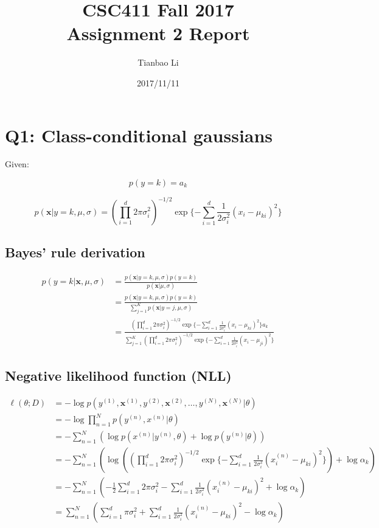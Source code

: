 \documentclass[a4paper]{article}
\title{CSC411 Fall 2017\\Assignment 2 Report}
\author{Tianbao Li}
\date{2017/11/11}
\begin{document}
\maketitle

\section{Q1: Class-conditional gaussians}

Given:

\begin{equation}
    p(y=k)=a_k
\end{equation}

\begin{equation}
    p(\mathbf{x}|y=k,\mu,\sigma)=(\prod^d_{i=1}2\pi\sigma^2_i)^{-1/2}\exp\{-\sum^d_{i=1}\frac{1}{2\sigma^2_i}(x_i-\mu_{ki})^2\}
\end{equation}

\subsection{Bayes' rule derivation}

\begin{align*}
    p(y=k|\mathbf{x},\mu,\sigma)&=\frac{p(\mathbf{x}|y=k,\mu,\sigma)p(y=k)}{p(\mathbf{x}|\mu,\sigma)}\\
    &=\frac{p(\mathbf{x}|y=k,\mu,\sigma)p(y=k)}{\sum^K_{j=1}p(\mathbf{x}|y=j,\mu,\sigma)}\\
    &=\frac{(\prod^d_{i=1}2\pi\sigma^2_i)^{-1/2}\exp\{-\sum^d_{i=1}\frac{1}{2\sigma^2_i}(x_i-\mu_{ki})^2\}a_k}{\sum^K_{j=1}(\prod^d_{i=1}2\pi\sigma^2_i)^{-1/2}\exp\{-\sum^d_{i=1}\frac{1}{2\sigma^2_i}(x_i-\mu_{ji})^2\}}
\end{align*}

\subsection{Negative likelihood function (NLL)}

\begin{align*}
    \ell(\theta;D)&=-\log p(y^{(1)},\mathbf{x}^{(1)},y^{(2)},\mathbf{x}^{(2)},\dots,y^{(N)},\mathbf{x}^{(N)}|\theta)\\
    &=-\log\prod^N_{n=1}p(y^{(n)},x^{(n)}|\theta)\\
    &=-\sum^N_{n=1}(\log p(x^{(n)}|y^{(n)},
    \theta)+\log p(y^{(n)}|\theta))\\
    &=-\sum^N_{n=1}(\log((\prod^d_{i=1}2\pi\sigma^2_i)^{-1/2}\exp\{-\sum^d_{i=1}\frac{1}{2\sigma^2_i}(x_i^{(n)}-\mu_{ki})^2\})+\log\alpha_k)\\
    &=-\sum^N_{n=1}(-\frac{1}{2}\sum^d_{i=1}2\pi\sigma^2_i-\sum^d_{i=1}\frac{1}{2\sigma^2_i}(x^{(n)}_i-\mu_{ki})^2+\log\alpha_k)\\
    &=\sum^N_{n=1}(\sum^d_{i=1}\pi\sigma^2_i+\sum^d_{i=1}\frac{1}{2\sigma^2_i}(x^{(n)}_i-\mu_{ki})^2-\log\alpha_k)
\end{align*}
\end{document}
